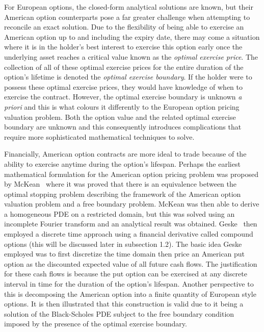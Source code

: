 For European options, the closed-form analytical solutions are known, but their American option counterparts pose a far greater challenge when attempting to reconcile an exact solution. Due to the flexibility of being able to exercise an American option up to and including the expiry date, there may come a situation where it is in the holder's best interest to exercise this option early once the underlying asset reaches a critical value known as the \emph{optimal exercise price}. The collection of all of these optimal exercise prices for the entire duration of the option's lifetime is denoted the \emph{optimal exercise boundary}. If the holder were to possess these optimal exercise prices, they would have knowledge of when to exercise the contract. However, the optimal exercise boundary is unknown \emph{a priori} and this is what colours it differently to the European option pricing valuation problem. Both the option value and the related optimal exercise boundary are unknown and this consequently introduces complications that require more sophisticated mathematical techniques to solve.

Financially, American option contracts are more ideal to trade because of the ability to exercise anytime during the option's lifespan. Perhaps the earliest mathematical formulation for the American option pricing problem was proposed by McKean~\cite{McKean1965} where it was proved that there is an equivalence between the optimal stopping problem describing the framework of the American option valuation problem and a free boundary problem. McKean was then able to derive a homogeneous PDE on a restricted domain, but this was solved using an incomplete Fourier transform and an analytical result was obtained. Geske~\cite{Geske1984} then employed a discrete time approach using a financial derivative called compound options (this will be discussed later in subsection 1.2). The basic idea Geske employed was to first discretize the time domain then price an American put option as the discounted expected value of all future cash flows. The justification for these cash flows is because the put option can be exercised at any discrete interval in time for the duration of the option's lifespan. Another perspective to this is decomposing the American option into a finite quantity of European style options. It is then illustrated that this construction is valid due to it being a solution of the Black-Scholes PDE subject to the free boundary condition imposed by the presence of the optimal exercise boundary.

